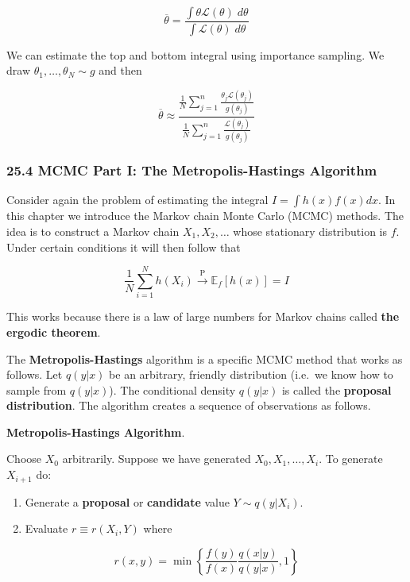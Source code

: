 \[ \overline{\theta} = \frac{\int \theta \mathcal{L}(\theta) \; d\theta }{\int \mathcal{L}(\theta) \; d\theta} \]

We can estimate the top and bottom integral using importance sampling.
We draw \(\theta_1, \dots, \theta_N \sim g\) and then

\[ \overline{\theta} \approx \frac{ \frac{1}{N} \sum_{j=1}^n \frac{\theta_j \mathcal{L}(\theta_j)}{g(\theta_j)}}{\frac{1}{N} \sum_{j=1}^n \frac{\mathcal{L}(\theta_j)}{g(\theta_j)}} \]


\subsubsection{25.4 MCMC Part I: The Metropolis-Hastings
Algorithm}\label{mcmc-part-i-the-metropolis-hastings-algorithm}

Consider again the problem of estimating the integral
\(I = \int h(x) f(x) dx\). In this chapter we introduce the Markov chain
Monte Carlo (MCMC) methods. The idea is to construct a Markov chain
\(X_1, X_2, \dots\) whose stationary distribution is \(f\). Under
certain conditions it will then follow that

\[ \frac{1}{N} \sum_{i=1}^N h(X_i) \xrightarrow{\text{P}} \mathbb{E}_f[h(x)] = I \]

This works because there is a law of large numbers for Markov chains
called \textbf{the ergodic theorem}.

The \textbf{Metropolis-Hastings} algorithm is a specific MCMC method
that works as follows. Let \(q(y | x)\) be an arbitrary, friendly
distribution (i.e.~we know how to sample from \(q(y | x)\)). The
conditional density \(q(y | x)\) is called the \textbf{proposal
distribution}. The algorithm creates a sequence of observations as
follows.

\textbf{Metropolis-Hastings Algorithm}.

Choose \(X_0\) arbitrarily. Suppose we have generated
\(X_0, X_1, \dots, X_i\). To generate \(X_{i+1}\) do:

\begin{enumerate}[tightlist,label={\arabic*.}]
\item
  Generate a \textbf{proposal} or \textbf{candidate} value
  \(Y \sim q(y | X_i)\).
\item
  Evaluate \(r \equiv r(X_i, Y)\) where
\end{enumerate}

\[ r(x, y) = \min \left\{ \frac{f(y)}{f(x)} \frac{q(x | y)}{q(y | x)}, 1 \right\} \]

